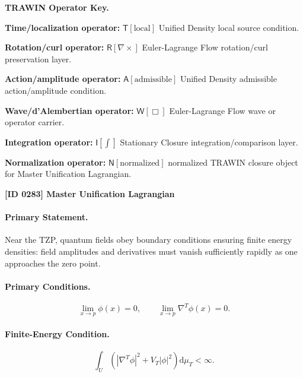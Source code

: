 \par\vspace{0.45\baselineskip}
\noindent\begin{minipage}[t]{\linewidth}
\begingroup
\small
\raggedright
\textbf{TRAWIN Operator Key.}\par
\noindent\textbf{Time/localization operator:} $\mathsf{T}\!\left[\mathrm{local}\right]$ Unified Density local source condition.\par
\noindent\textbf{Rotation/curl operator:} $\mathsf{R}\!\left[\nabla\times\right]$ Euler-Lagrange Flow rotation/curl preservation layer.\par
\noindent\textbf{Action/amplitude operator:} $\mathsf{A}\!\left[\mathrm{admissible}\right]$ Unified Density admissible action/amplitude condition.\par
\noindent\textbf{Wave/d'Alembertian operator:} $\mathsf{W}\!\left[\Box\right]$ Euler-Lagrange Flow wave or operator carrier.\par
\noindent\textbf{Integration operator:} $\mathsf{I}\!\left[\int\right]$ Stationary Closure integration/comparison layer.\par
\noindent\textbf{Normalization operator:} $\mathsf{N}\!\left[\mathrm{normalized}\right]$ normalized TRAWIN closure object for Master Unification Lagrangian.\par
\endgroup
\end{minipage}

\clearpage
\noindent\textbf{[ID 0283] Master Unification Lagrangian}\par
\vspace{0.35em}
\paragraph{Primary Statement.}
Near the TZP, quantum fields obey boundary conditions ensuring finite energy densities: field amplitudes and derivatives must vanish sufficiently rapidly as one approaches the zero point.

\paragraph{Primary Conditions.}
\begin{equation}
\lim_{x\to p}\phi(x)=0,
\qquad
\lim_{x\to p}\nabla^T\phi(x)=0 .
\end{equation}

\paragraph{Finite-Energy Condition.}
\begin{equation}
\int_U
\left(
|\nabla^T\phi|^2
+
V_T|\phi|^2
\right)
\mathrm{d}\mu_T
<\infty .
\end{equation}

